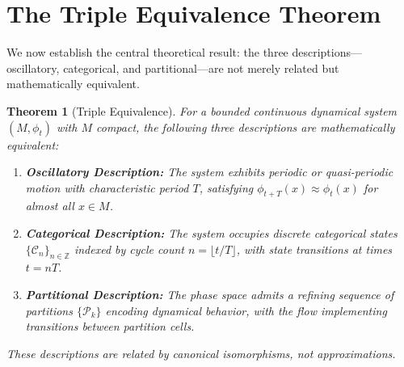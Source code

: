 \documentclass[twocolumn,10pt,a4paper]{article}
\newtheorem{theorem}{Theorem}[section]
\newcommand{\Z}{\mathbb{Z}}
\begin{document}
\section{The Triple Equivalence Theorem}
\label{sec:triple}

We now establish the central theoretical result: the three descriptions---oscillatory, categorical, and partitional---are not merely related but mathematically equivalent.

\begin{theorem}[Triple Equivalence]
\label{thm:triple}
For a bounded continuous dynamical system $(M, \phi_t)$ with $M$ compact, the following three descriptions are mathematically equivalent:

\begin{enumerate}[label=(\Roman*)]
    \item \textbf{Oscillatory Description:} The system exhibits periodic or quasi-periodic motion with characteristic period $T$, satisfying $\phi_{t+T}(x) \approx \phi_t(x)$ for almost all $x \in M$.

    \item \textbf{Categorical Description:} The system occupies discrete categorical states $\{\mathcal{C}_n\}_{n \in \Z}$ indexed by cycle count $n = \lfloor t/T \rfloor$, with state transitions at times $t = nT$.

    \item \textbf{Partitional Description:} The phase space admits a refining sequence of partitions $\{\mathcal{P}_k\}$ encoding dynamical behavior, with the flow implementing transitions between partition cells.
\end{enumerate}

These descriptions are related by canonical isomorphisms, not approximations.
\end{theorem}
\end{document}
